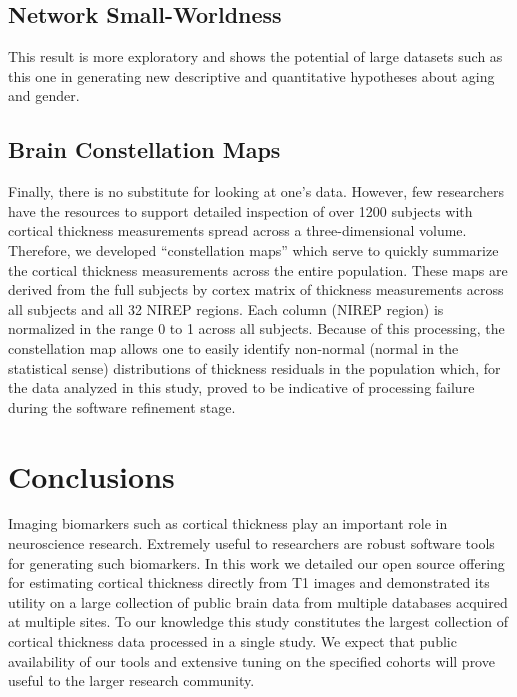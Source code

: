 \subsection{Network Small-Worldness}
This result is more exploratory and shows the potential of large
datasets such as this one in generating new descriptive and
quantitative hypotheses about aging and gender.  

\subsection{Brain Constellation Maps}
Finally, there is no substitute for looking at one's data.  However,
few researchers have the resources to support detailed 
inspection of over 1200 subjects with cortical thickness
measurements spread across a three-dimensional volume.  Therefore, we
developed ``constellation maps'' which serve to quickly summarize the
cortical thickness measurements across the entire population.   These
maps are derived from the full subjects by cortex %
matrix of thickness measurements
across all subjects and all 32 NIREP regions.  Each column (NIREP
region) is normalized in the range 0 to 1 across all subjects.
Because of this processing, the constellation map allows one to
easily identify non-normal (normal in the statistical sense)
distributions of thickness residuals in the population which,
for the data analyzed in this study, proved to be indicative
of processing failure  during the software refinement stage.  

\section{Conclusions}

Imaging biomarkers such as cortical thickness play an 
important role in neuroscience research.  Extremely useful to
researchers are robust software tools for generating such 
biomarkers.  In this work we detailed our open source offering for estimating
cortical thickness directly from T1 images and demonstrated
its utility on a large collection of public brain data from
multiple databases acquired at multiple sites.  To our knowledge
this study constitutes the largest collection of cortical
thickness data processed in a single study.  
We expect that public availability of our tools and extensive tuning on 
the specified cohorts will prove useful to the larger
research community.  

